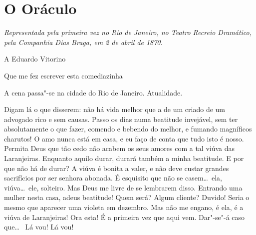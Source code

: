 \chapter[O Oráculo]{O Oráculo}

\textit{Representada pela primeira vez no Rio de Janeiro, no Teatro
Recreio Dramático, pela Companhia Dias Braga,
em 2 de abril de 1870.}

\hfill A Eduardo Vitorino

\hfill Que me fez escrever esta comediazinha

\castpage


\vfil
A cena passa"-se na cidade do Rio de Janeiro. Atualidade.

\pagebreak





   Digam lá o que disserem: não há vida
melhor que a de um criado de um advogado rico e sem causas. Passo os
dias numa beatitude invejável, sem ter absolutamente o que fazer,
comendo e bebendo do melhor, e fumando magníficos charutos! O amo nunca
está em casa, e eu faço de conta que tudo isto é nosso. Permita Deus
que tão cedo não acabem os seus amores com a tal viúva das Laranjeiras.
Enquanto aquilo durar, durará também a minha beatitude. E por que não
há de durar? A viúva é bonita a valer, e não deve custar grandes
sacrifícios por ser senhora abonada.  É
esquisito que não se casem\ldots\ ela, viúva\ldots\ ele, solteiro. Mas Deus me
livre de se lembrarem disso. Entrando uma mulher nesta casa, adeus
beatitude!  Quem será? Algum cliente? Duvido! Seria o mesmo
que aparecer uma violeta em dezembro.  Mas não me engano, é ela, é a viúva
de Laranjeiras! Ora esta! É a primeira vez que aqui vem. Dar"-se"-á caso
que\ldots\  Lá vou! Lá vou!

